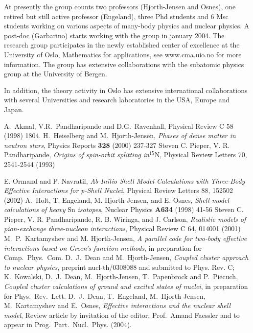 \documentclass{article}
\begin{document}
At presently the group counts  two professors (Hjorth-Jensen and Osnes), 
one retired but still active professor (Engeland), 
three Phd students 
and 6 Msc students
working on various
aspects of many-body physics and nuclear physics. A post-doc
(Garbarino) starts working with the group in january 2004.
The research group participates in the newly established
center of excellence at the University of Oslo, Mathematics
for applications, see www.cma.uio.no for more information.
The group has extensive collaborations with the subatomic physics
group at the University of Bergen.


In addition, the theory activity in Oslo has extensive
international collaborations with several Universities and research 
laboratories in the USA, Europe and Japan. 


\begin{thebibliography}{}


 A.\ Akmal, V.R.\ Pandharipande and D.G.\ Ravenhall,
Physical  Review  C 58 (1998) 1804.
    H.\ Heiselberg and M.\ Hjorth-Jensen,
    {\em Phases of dense matter in neutron stars},
    Physics Reports {\bf 328} (2000) 237-327 
Steven C. Pieper, V. R. Pandharipande, 
{\em Origins of spin-orbit splitting in}$^{15}$N, Physical Review Letters 70, 2541-2544 (1993)

 E. Ormand and P. Navratil, 
{\em Ab Initio Shell Model Calculations with Three-Body Effective Interactions for p-Shell Nuclei}, Physical Review Letters 88, 152502 (2002)
 A.\ Holt, T. Engeland, M. Hjorth-Jensen, and E. Osnes,
    {\em Shell-model calculations of heavy} Sn {\em isotopes}, 
    Nuclear Physics {\bf A634} (1998) 41-56
  Steven C. Pieper, V. R. Pandharipande, 
                  R. B. Wiringa, and J. Carlson, {\em Realistic models of pion-exchange three-nucleon interactions}, Physical Review C 64, 014001 (2001)
 M.~P.~Kartamyshev and M. Hjorth-Jensen, {\em A parallel code
for two-body effective interactions based on Green's function methods}, 
in preparation for Comp.~Phys.~Com.
 D.~J.~Dean and M.~Hjorth-Jensen, {\em Coupled cluster
approach to nuclear physics}, preprint nucl-th/0308088 and submitted to
Phys. Rev. C; K.~Kowalski, D.~J.~Dean, M.~Hjorth-Jensen, T.~Papenbrock and 
P.~Piecuch, {\em Coupled cluster
calculations of ground and excited states of nuclei}, in preparation for
Phys.~Rev.~Lett.
 D.~J.~Dean, T.~Engeland, M.\ Hjorth-Jensen, 
M.~Kartamyshev and E.~Osnes, {\em Effective interactions
and the nuclear shell model}, Review article by invitation of the editor,
Prof.~Amand Faessler and to appear in 
Prog.~Part.~Nucl.~Phys. (2004).

\end{thebibliography}
\end{document}
